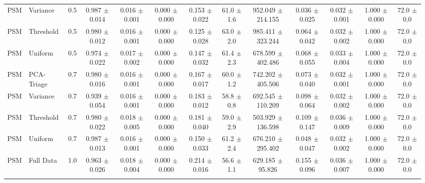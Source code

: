 \begin{table}[p]
{\begin{tabular}{@{}llccccccccccc@{}}
PSM & Variance & 0.5 & 0.987 $\pm$ 0.014 & 0.016 $\pm$ 0.001 & 0.000 $\pm$ 0.000 & 0.153 $\pm$ 0.022 & 61.0 $\pm$ 1.6 & 952.049 $\pm$ 214.155 & 0.036 $\pm$ 0.025 & 0.032 $\pm$ 0.001 & 1.000 $\pm$ 0.000 & 72.0 $\pm$ 0.0 \\
PSM & Threshold & 0.5 & 0.980 $\pm$ 0.012 & 0.016 $\pm$ 0.001 & 0.000 $\pm$ 0.000 & 0.125 $\pm$ 0.028 & 63.0 $\pm$ 2.0 & 985.411 $\pm$ 323.244 & 0.064 $\pm$ 0.042 & 0.032 $\pm$ 0.002 & 1.000 $\pm$ 0.000 & 72.0 $\pm$ 0.0 \\
PSM & Uniform & 0.5 & 0.974 $\pm$ 0.022 & 0.017 $\pm$ 0.002 & 0.000 $\pm$ 0.000 & 0.147 $\pm$ 0.032 & 61.4 $\pm$ 2.3 & 678.599 $\pm$ 402.486 & 0.068 $\pm$ 0.055 & 0.033 $\pm$ 0.004 & 1.000 $\pm$ 0.000 & 72.0 $\pm$ 0.0 \\
PSM & PCA-Triage & 0.7 & 0.980 $\pm$ 0.016 & 0.016 $\pm$ 0.001 & 0.000 $\pm$ 0.000 & 0.167 $\pm$ 0.017 & 60.0 $\pm$ 1.2 & 742.202 $\pm$ 405.506 & 0.073 $\pm$ 0.040 & 0.032 $\pm$ 0.001 & 1.000 $\pm$ 0.000 & 72.0 $\pm$ 0.0 \\
PSM & Variance & 0.7 & 0.939 $\pm$ 0.054 & 0.016 $\pm$ 0.001 & 0.000 $\pm$ 0.000 & 0.183 $\pm$ 0.012 & 58.8 $\pm$ 0.8 & 692.545 $\pm$ 110.209 & 0.098 $\pm$ 0.064 & 0.032 $\pm$ 0.002 & 1.000 $\pm$ 0.000 & 72.0 $\pm$ 0.0 \\
PSM & Threshold & 0.7 & 0.980 $\pm$ 0.022 & 0.018 $\pm$ 0.005 & 0.000 $\pm$ 0.000 & 0.181 $\pm$ 0.040 & 59.0 $\pm$ 2.9 & 503.929 $\pm$ 136.598 & 0.109 $\pm$ 0.147 & 0.036 $\pm$ 0.009 & 1.000 $\pm$ 0.000 & 72.0 $\pm$ 0.0 \\
PSM & Uniform & 0.7 & 0.987 $\pm$ 0.013 & 0.016 $\pm$ 0.001 & 0.000 $\pm$ 0.000 & 0.150 $\pm$ 0.033 & 61.2 $\pm$ 2.4 & 676.210 $\pm$ 295.402 & 0.048 $\pm$ 0.047 & 0.032 $\pm$ 0.002 & 1.000 $\pm$ 0.000 & 72.0 $\pm$ 0.0 \\
PSM & Full Data & 1.0 & 0.963 $\pm$ 0.026 & 0.018 $\pm$ 0.004 & 0.000 $\pm$ 0.000 & 0.214 $\pm$ 0.016 & 56.6 $\pm$ 1.1 & 629.185 $\pm$ 95.826 & 0.155 $\pm$ 0.096 & 0.036 $\pm$ 0.007 & 1.000 $\pm$ 0.000 & 72.0 $\pm$ 0.0 \\
\addlinespace
\bottomrule
\end{tabular}%
}
\label{supp-det-psm-method_retrained}
\end{table}
